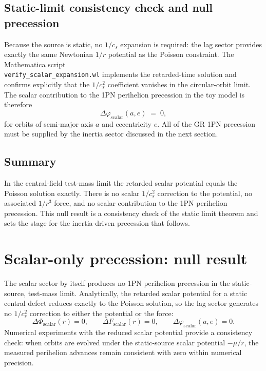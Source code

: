 \documentclass[11pt]{article}
\newcommand{\cS}{c_s}
\begin{document}
\subsection{Static-limit consistency check and null precession}

Because the source is static, no $1/\cS$ expansion is required: the lag sector
provides exactly the same Newtonian $1/r$ potential as the Poisson constraint.
The Mathematica script\\
\texttt{verify\_scalar\_expansion.wl} implements the
retarded-time solution and confirms explicitly that the $1/\cS^2$ coefficient
vanishes in the circular-orbit limit.  The scalar contribution to the 1PN
perihelion precession in the toy model is therefore
\begin{equation}
  \Delta\varphi_{\mathrm{scalar}}(a,e) \;=\; 0,
  \label{eq:Delta_phi_scalar_result}
\end{equation}
for orbits of semi-major axis $a$ and eccentricity $e$.  All of the GR 1PN
precession must be supplied by the inertia sector discussed in the next
section.

\subsection{Summary}

In the central-field test-mass limit the retarded scalar potential equals the
Poisson solution exactly.  There is no scalar $1/\cS^2$ correction to the
potential, no associated $1/r^3$ force, and no scalar contribution to the 1PN
perihelion precession.  This null result is a consistency check of the static
limit theorem and sets the stage for the inertia-driven precession that
follows.

\section{Scalar-only precession: null result}
\label{sec:scalar_null}

The scalar sector by itself produces no 1PN perihelion precession in the static-source, test-mass limit. Analytically, the retarded scalar potential for a static central defect reduces exactly to the Poisson solution, so the lag sector generates no $1/\cS^2$ correction to either the potential or the force:
\begin{equation}
  \Delta \Phi_{\mathrm{scalar}}(r) = 0,
  \qquad
  \Delta F_{\mathrm{scalar}}(r) = 0,
  \qquad
  \Delta \varphi_{\mathrm{scalar}}(a,e) = 0.
\end{equation}
Numerical experiments with the reduced scalar potential provide a consistency check: when orbits are evolved under the static-source scalar potential $-\mu/r$, the measured perihelion advances remain consistent with zero within numerical precision.
\end{document}
